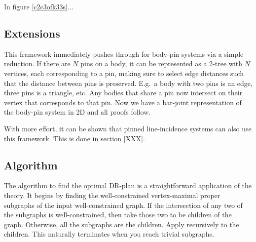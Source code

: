 \begin{figure*}
\begin{tikzpicture}[scale=3]


\end{tikzpicture}

\caption{A doublet with each edge replaced by a $K3,3$. }
\label{c2c3ofk33s}
\end{figure*}

In figure \ref{c2c3ofk33s}... 





\subsection{Extensions}
This framework immediately pushes through for body-pin systems via a simple reduction. If there are $N$ pins on a body, it can be represented as a 2-tree with $N$ vertices, each corresponding to a pin, making sure to select edge distances such that the distance between pins is preserved. E.g.\ a body with two pins is an edge, three pins is a triangle, etc. Any bodies that share a pin now intersect on their vertex that corresponds to that pin. Now we have a bar-joint representation of the body-pin system in 2D and all proofs follow.

With more effort, it can be shown that pinned line-incidence systems can also use this framework. This is done in section \ref{XXX}.



\subsection{Algorithm}
The algorithm to find the optimal DR-plan is a straightforward application of the theory. It begins by finding the well-constrained vertex-maximal proper subgraphs of the input well-constrained graph. If the intersection of any two of the subgraphs is well-constrained, then take those two to be children of the graph. Otherwise, all the subgraphs are the children. Apply recursively to the children. This naturally terminates when you reach trivial subgraphs.
